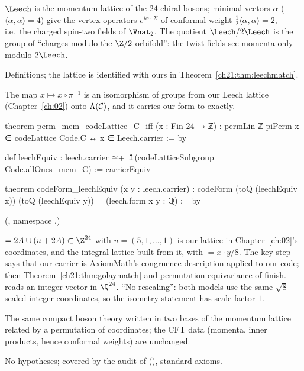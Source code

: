 \begin{physics}
$\Leech$ is the momentum lattice of the $24$ chiral bosons; minimal vectors $\alpha$
($\langle\alpha,\alpha\rangle=4$) give the vertex operators $e^{i\alpha\cdot X}$ of conformal weight
$\tfrac12\langle\alpha,\alpha\rangle=2$, i.e.\ the charged spin-two fields of $\Vnat_2$.  The quotient
$\Leech/2\Leech$ is the group of ``charges modulo the $\Z/2$ orbifold'': the twist fields see momenta
only modulo $2\Leech$.
\end{physics}
\begin{status}
Definitions; the lattice is identified with ours in Theorem~\ref{ch21:thm:leechmatch}.
\end{status}

\begin{theorem}\label{ch21:thm:leechmatch}
The map $x\mapsto x\circ\pi^{-1}$ is an isomorphism of groups from our Leech lattice
(Chapter~\ref{ch:02}) onto $\Lambda(\mathcal{C})$, and it carries our form to  exactly.
\end{theorem}
\begin{leancode}
theorem perm_mem_codeLattice_C_iff (x : Fin 24 → ℤ) :
    permLin ℤ piPerm x ∈ codeLattice Code.C ↔ x ∈ Leech.carrier := by
\end{leancode}
\begin{leancode}
def leechEquiv : leech.carrier ≃+ ↥(codeLatticeSubgroup Code.allOnes_mem_C) := carrierEquiv
\end{leancode}
\begin{leancode}
theorem codeForm_leechEquiv (x y : leech.carrier) :
    codeForm (toQ (leechEquiv x)) (toQ (leechEquiv y)) = (leech.form x y : ℚ) := by
\end{leancode}
(, namespace
.)
\begin{dictionary}
 $=2A\cup(u+2A)\subset\Z^{24}$ with $u=(5,1,\dots,1)$ is our lattice in
Chapter~\ref{ch:02}'s coordinates, and  the integral lattice built from it, with
 $=x\cdot y/8$.  The key step  says that our
carrier is AxiomMath's congruence description applied to our code; then
Theorem~\ref{ch21:thm:golaymatch} and permutation-equivariance of  finish.
 reads an integer vector in $\Q^{24}$.  ``No rescaling'': both models use the same
$\sqrt8$-scaled integer coordinates, so the isometry statement has scale factor $1$.
\end{dictionary}
\begin{physics}
The same compact boson theory written in two bases of the momentum lattice related by a permutation of
coordinates; the CFT data (momenta, inner products, hence conformal weights) are unchanged.
\end{physics}
\begin{status}
No hypotheses; covered by the audit of  (),
standard axioms.
\end{status}


